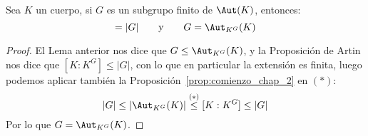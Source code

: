 \begin{teo}\label{teo:antes_teo_angular}
    Sea $K$ un cuerpo, si $G$ es un subgrupo finito de $\Aut(K)$, entonces:
    \begin{equation*}
        [K:K^G] = |G| \qquad \text{y}\qquad G = \Aut_{K^G}(K)
    \end{equation*}
    \begin{proof}
        El Lema anterior nos dice que $G\leq \Aut_{K^G}(K)$, y la Proposición de Artin nos dice que $[K:K^G]\leq |G|$, con lo que en particular la extensión es finita, luego podemos aplicar también la Proposición~\ref{prop:comienzo_chap_2} en $(\ast)$:
        \begin{equation*}
            |G| \leq |\Aut_{K^G}(K)| \stackrel{(\ast)}{\leq} [K:K^G] \leq |G|
        \end{equation*}
        Por lo que $G = \Aut_{K^G}(K)$.
    \end{proof}
\end{teo}

